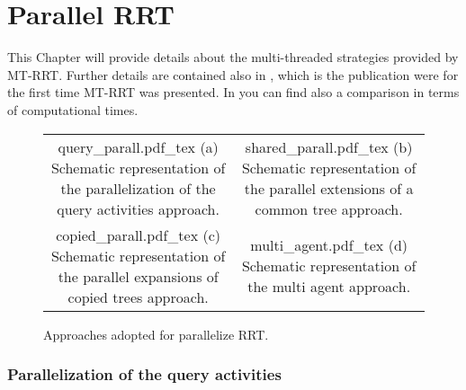 \chapter{Parallel RRT}
\label{chap:parallel_RRT}

This Chapter will provide details about the multi-threaded strategies provided by MT-RRT. Further details are contained also in \cite{MT_RRT}, which is the publication were for the first time MT-RRT was presented. In \cite{MT_RRT} you can find also a comparison in terms of computational times.

 \begin{figure}
\begin{tabular}{cc}
\begin{minipage}[t]{0.49\textwidth}
 \def\svgwidth{0.69 \columnwidth}
 {query_parall.pdf_tex} 
 (a) Schematic representation of the parallelization of the query activities approach.
\end{minipage}
 &  
\begin{minipage}[t]{0.49\textwidth}
 \def\svgwidth{0.79 \columnwidth}
 {shared_parall.pdf_tex} 
 (b) Schematic representation of the parallel extensions of a common tree approach.
\end{minipage}
 \\
\begin{minipage}[t]{0.49\textwidth}
 \def\svgwidth{0.59 \columnwidth}
 {copied_parall.pdf_tex} 
 (c) Schematic representation of the parallel expansions of copied trees approach.
\end{minipage}
 & 
\begin{minipage}[t]{0.49\textwidth}
 \def\svgwidth{0.79 \columnwidth}
 {multi_agent.pdf_tex} 
 (d) Schematic representation of the multi agent approach. 
\end{minipage}
\end{tabular}
	 \caption{Approaches adopted for parallelize RRT.}
 \label{fig:parall_strategies}
\end{figure}

\subsection{Parallelization of the query activities}
\label{sec:strtg_query}

